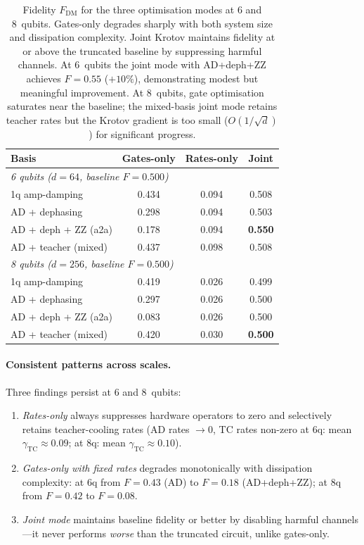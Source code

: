 \documentclass[11pt,a4paper]{article}
\begin{document}
\begin{table}[ht]
\centering
\begin{tabular}{@{}l@{\quad}c@{\quad}c@{\quad}c@{}}
\toprule
\textbf{Basis} & \textbf{Gates-only} & \textbf{Rates-only}
& \textbf{Joint} \\
\midrule
\multicolumn{4}{l}{\textit{6 qubits ($d = 64$, baseline $F = 0.500$)}} \\
\quad 1q amp-damping
  & 0.434 & 0.094 & 0.508 \\
\quad AD + dephasing
  & 0.298 & 0.094 & 0.503 \\
\quad AD + deph + ZZ (a2a)
  & 0.178 & 0.094 & \textbf{0.550} \\
\quad AD + teacher (mixed)
  & 0.437 & 0.098 & 0.508 \\
\midrule
\multicolumn{4}{l}{\textit{8 qubits ($d = 256$, baseline $F = 0.500$)}} \\
\quad 1q amp-damping
  & 0.419 & 0.026 & 0.499 \\
\quad AD + dephasing
  & 0.297 & 0.026 & 0.500 \\
\quad AD + deph + ZZ (a2a)
  & 0.083 & 0.026 & 0.500 \\
\quad AD + teacher (mixed)
  & 0.420 & 0.030 & \textbf{0.500} \\
\bottomrule
\end{tabular}
\caption{%
Fidelity $F_\text{DM}$ for the three optimisation modes at 6 and
8~qubits.  Gates-only degrades sharply with both system size and
dissipation complexity. Joint Krotov maintains fidelity at or above
the truncated baseline by suppressing harmful channels.
At 6~qubits the joint mode with AD+deph+ZZ achieves
$F = 0.55$ ($+10\%$), demonstrating modest but meaningful
improvement.  At 8~qubits, gate optimisation saturates near
the baseline; the mixed-basis joint mode retains teacher rates but
the Krotov gradient is too small ($O(1/\sqrt{d})$) for significant
progress.
}
\label{tab:rate_krotov_scaling}
\end{table}

\paragraph{Consistent patterns across scales.}
Three findings persist at 6 and 8~qubits:
\begin{enumerate}[nosep]
\item \emph{Rates-only} always suppresses hardware operators to zero and
  selectively retains teacher-cooling rates (AD rates $\to 0$, TC rates
  non-zero at 6q: mean $\gamma_\text{TC} \approx 0.09$; at 8q: mean
  $\gamma_\text{TC} \approx 0.10$).
\item \emph{Gates-only with fixed rates} degrades monotonically with
  dissipation complexity: at 6q from $F = 0.43$ (AD) to $F = 0.18$
  (AD+deph+ZZ); at 8q from $F = 0.42$ to $F = 0.08$.
\item \emph{Joint mode} maintains baseline fidelity or better by
  disabling harmful channels---it never performs \emph{worse} than the
  truncated circuit, unlike gates-only.
\end{enumerate}
\end{document}

